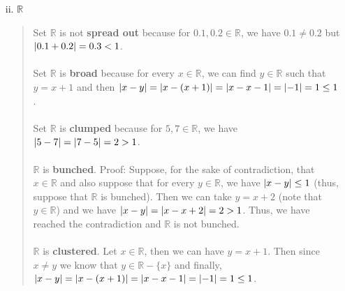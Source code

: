 \documentclass[12pt, a4paper]{article}                      %
\newcommand\und[1]{\underline{\smash{#1}}}
\DeclarePairedDelimiter\abs{\lvert}{\rvert}
\begin{document}
\begin{itemize}
\begin{itemize}
\begin{itemize}
\item[ii.]
$\mathbb{R}$
\begin{quote}
Set $\mathbb{R}$ is not \und{NOT} \textbf{spread out} because for $0.1, 0.2 \in \mathbb{R}$, we have $0.1 \neq 0.2$ but $\abs{0.1 + 0.2} = 0.3 < 1$.
\\\\
Set $\mathbb{R}$ is \textbf{broad} because for every $x \in \mathbb{R}$, we can find $y \in \mathbb{R}$ such that $y = x + 1$ and then $\abs{x - y} = \abs{x - (x + 1)} = \abs{x - x - 1} = \abs{-1} = 1 \leq 1$.
\\\\
Set $\mathbb{R}$ is \und{NOT} \textbf{clumped} because for $5, 7 \in \mathbb{R}$, we have $\abs{5 - 7} = \abs{7 - 5} = 2 > 1$.
\\\\
$\mathbb{R}$ is \und{NOT} \textbf{bunched}. Proof: Suppose, for the sake of contradiction, that $x \in \mathbb{R}$ and also suppose that for every $y \in \mathbb{R}$, we have $\abs{x - y} \leq 1$ (thus, suppose that $\mathbb{R}$ is bunched).
Then we can take $y = x + 2$ (note that $y \in \mathbb{R}$) and we have $\abs{x - y} = \abs{x - x + 2} = 2 > 1$. Thus, we have reached the contradiction and $\mathbb{R}$ is not bunched.
\\\\
$\mathbb{R}$ is \textbf{clustered}. Let $x \in \mathbb{R}$, then we can have $y = x + 1$. Then since $x \neq y$ we know that $y \in \mathbb{R} - \{x\}$
and finally, $\abs{x - y} = \abs{x - (x + 1)} = \abs{x - x - 1} = \abs{-1} = 1 \leq 1$.
\end{quote}

\item[]


\end{itemize}
\end{itemize}
\end{itemize}
\end{document}
